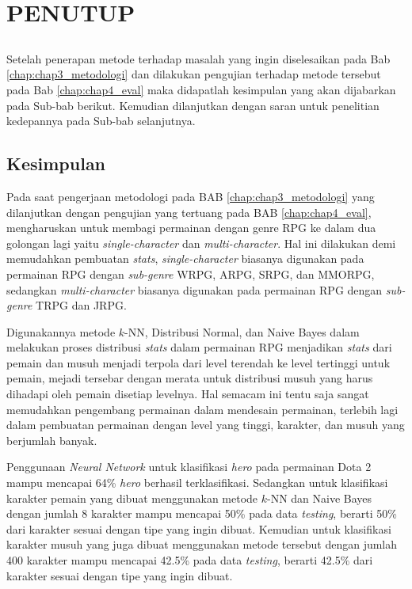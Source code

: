 \chapter{PENUTUP}
\label{sec:chap5_tutup}
\vspace{1ex}

\section*{}
Setelah penerapan metode terhadap masalah yang ingin diselesaikan pada Bab \ref{chap:chap3_metodologi} dan dilakukan pengujian terhadap metode tersebut pada Bab \ref*{chap:chap4_eval} maka didapatlah kesimpulan yang akan dijabarkan pada Sub-bab berikut. Kemudian dilanjutkan dengan saran untuk penelitian kedepannya pada Sub-bab selanjutnya.
\vspace{1ex}

\section{Kesimpulan}
\label{sec:sec4_kesimpulan}
\vspace{1ex}

Pada saat pengerjaan metodologi pada BAB \ref{chap:chap3_metodologi} yang dilanjutkan dengan pengujian yang tertuang pada BAB \ref{chap:chap4_eval}, mengharuskan untuk membagi permainan dengan genre RPG ke dalam dua golongan lagi yaitu \textit{single-character} dan \textit{multi-character}. Hal ini dilakukan demi memudahkan pembuatan \textit{stats}, \textit{single-character} biasanya digunakan pada permainan RPG dengan \textit{sub-genre} WRPG, ARPG, SRPG, dan MMORPG, sedangkan \textit{multi-character} biasanya digunakan pada permainan RPG dengan \textit{sub-genre} TRPG dan JRPG.
\vspace{1ex}

Digunakannya metode $k$-NN, Distribusi Normal, dan Naive Bayes dalam melakukan proses distribusi \textit{stats} dalam permainan RPG menjadikan \textit{stats} dari pemain dan musuh menjadi terpola dari level terendah ke level tertinggi untuk pemain, mejadi tersebar dengan merata untuk distribusi musuh yang harus dihadapi oleh pemain disetiap levelnya. Hal semacam ini tentu saja sangat memudahkan pengembang permainan dalam mendesain permainan, terlebih lagi dalam pembuatan permainan dengan level yang tinggi, karakter, dan musuh yang berjumlah banyak.
\vspace{1ex}

Penggunaan \textit{Neural Network} untuk klasifikasi \textit{hero} pada permainan Dota 2 mampu mencapai 64\% \textit{hero} berhasil terklasifikasi. Sedangkan untuk klasifikasi karakter pemain yang dibuat menggunakan metode $k$-NN dan Naive Bayes dengan jumlah 8 karakter mampu mencapai 50\% pada data \textit{testing}, berarti 50\% dari karakter sesuai dengan tipe yang ingin dibuat. Kemudian untuk klasifikasi karakter musuh yang juga dibuat menggunakan metode tersebut dengan jumlah 400 karakter mampu mencapai 42.5\% pada data \textit{testing}, berarti 42.5\% dari karakter sesuai dengan tipe yang ingin dibuat.
\vspace{1ex}


